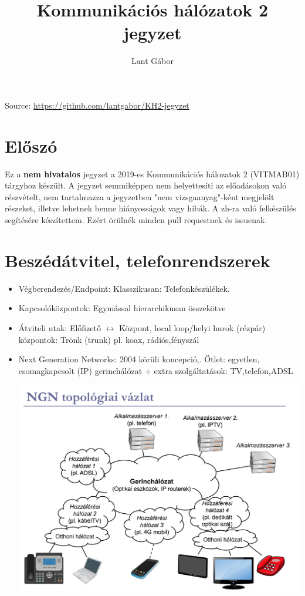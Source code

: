 \documentclass[10pt,a4paper]{article}
\title{Kommunikációs hálózatok 2 jegyzet}
\author{Lant Gábor}
\begin{document}
\maketitle
\noindent Source: \url{https://github.com/lantgabor/KH2-jegyzet}
\tableofcontents
\section{Előszó}
Ez a \textbf{nem hivatalos} jegyzet a 2019-es Kommunikációs hálozatok 2 (VITMAB01) tárgyhoz készült. A jegyzet semmiképpen nem helyettesíti az előadásokon való részvételt, nem tartalmazza a jegyzetben "nem vizsgaanyag"-ként megjelölt részeket, illetve lehetnek benne hiányosságok vagy hibák. A zh-ra való felkészülés segítésére készítettem. Ezért örülnék minden pull requestnek és issuenak.
\newpage
\section{Beszédátvitel, telefonrendszerek}
\begin{itemize}
\item Végberendezés/Endpoint: Klasszikusan: Telefonkészülékek.\\
\item Kapcsolóközpontok: Egymással hierarchikusan összekötve\\
\item Átviteli utak: Előfizető $\leftrightarrow $ Központ, local loop/helyi hurok (rézpár)\\
központok: Trönk (trunk) pl. koax, rádiós,fényszál
\item Next Generation Networks: 2004 körüli koncepció,. Ötlet: egyetlen, csomagkapcsolt (IP) gerinchálózat + extra szolgáltatások: TV,telefon,ADSL
\begin{center}
	\includegraphics[width=0.9\linewidth]{src/NNG}
\end{center}
\end{itemize}
\end{document}
